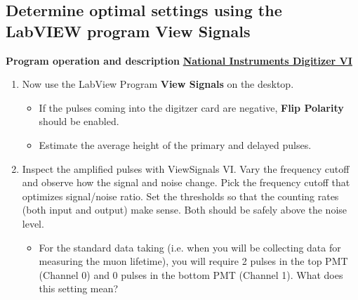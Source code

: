 \documentclass{../lab}
\begin{document}


\subsection{Determine optimal settings using the LabVIEW program View Signals}

\textbf{Program operation and description} \href{http://experimentationlab.berkeley.edu/node/88}{\textbf{National Instruments Digitizer VI}}

\begin{enumerate}
    \item Now use the LabView Program \textbf{View Signals} on the desktop.

    \begin{itemize}
        \item If the pulses coming into the digitzer card are negative, \textbf{Flip Polarity} should be enabled.

        \item Estimate the average height of the primary and delayed pulses.

    \end{itemize}

    \item Inspect the amplified pulses with ViewSignals VI. Vary the frequency cutoff and observe how the signal and noise change. Pick the frequency cutoff that optimizes signal/noise ratio. Set the thresholds so that the counting rates (both input and output) make sense. Both should be safely above the noise level.

    \begin{itemize}
        \item For the standard data taking (i.e. when you will be collecting data for measuring the muon lifetime), you will require 2 pulses in the top PMT (Channel 0) and 0 pulses in the bottom PMT (Channel 1). What does this setting mean?

    \end{itemize}


\end{enumerate}
\end{document}
